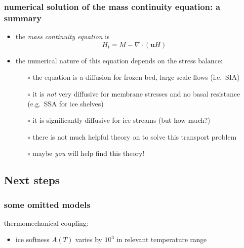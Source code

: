 \documentclass[titlepage,letterpaper,final,12pt]{scrartcl}
\begin{document}
\subsubsection*{numerical solution of the mass continuity equation: a summary}

\begin{itemize}
\item the \emph{mass continuity equation} is
  $$H_t = M - \nabla \cdot (\mathbf{u} H)$$
\item the numerical nature of this equation depends on the stress balance:
  \begin{itemize}
  \item[$\circ$] the equation is a diffusion for frozen bed, large scale flows (i.e.~SIA)
  \item[$\circ$] it is \emph{not} very diffusive for membrane stresses and no basal resistance (e.g.~SSA for ice shelves)
  \item[$\circ$] it is significantly diffusive for ice streams (but how much?)
  \item[$\circ$] there is not much helpful theory on to solve this transport problem
  \item[$\circ$] maybe \emph{you} will help find this theory!
  \end{itemize}
\end{itemize}


\subsection{Next steps}




\subsubsection*{some omitted models}

thermomechanical coupling:

\begin{itemize}
\item ice softness $A(T)$ varies by $10^3$ in relevant temperature range
\end{itemize}
\end{document}
